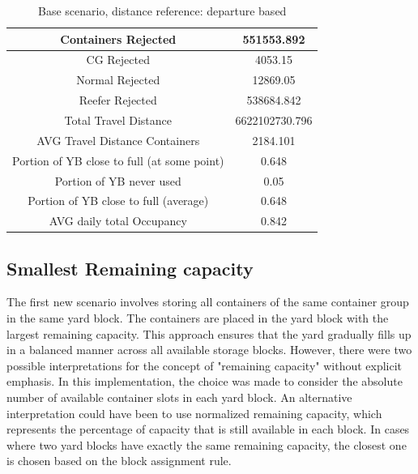 \documentclass{article}
\begin{document}
\begin{table}[h]
    \centering
    \begin{tabular}{|c|c|}
        \hline
        Containers Rejected                         & 551553.892     \\ \hline
        CG Rejected                                 & 4053.15        \\ \hline
        Normal Rejected                             & 12869.05       \\ \hline
        Reefer Rejected                             & 538684.842     \\ \hline
        Total Travel Distance                       & 6622102730.796 \\ \hline
        AVG Travel Distance Containers              & 2184.101       \\ \hline
        Portion of YB close to full (at some point) & 0.648          \\ \hline
        Portion of YB never used                    & 0.05           \\ \hline
        Portion of YB close to full (average)       & 0.648          \\ \hline
        AVG daily total Occupancy                   & 0.842          \\ \hline
    \end{tabular}
    \caption{Base scenario, distance reference: departure based}
    \label{tab:Base_departure}
\end{table}

\subsection{Smallest Remaining capacity}
The first new scenario involves storing all containers of the same container
group in the same yard block. The containers are placed in the yard block with
the largest remaining capacity. This approach ensures that the yard gradually
fills up in a balanced manner across all available storage blocks. However,
there were two possible interpretations for the concept of "remaining capacity"
without explicit emphasis. In this implementation, the choice was made to
consider the absolute number of available container slots in each yard block.
An alternative interpretation could have been to use normalized remaining
capacity, which represents the percentage of capacity that is still available
in each block. In cases where two yard blocks have exactly the same remaining
capacity, the closest one is chosen based on the block assignment rule.
\end{document}
